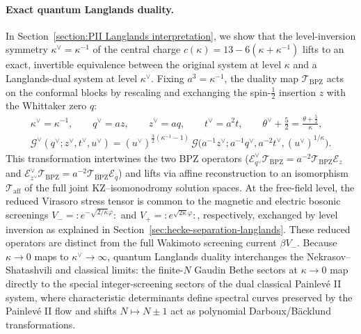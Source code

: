 \documentclass[a4paper,11pt]{article}
\numberwithin{equation}{section}
\begin{document}
\paragraph{Exact quantum Langlands duality.}
In Section~\ref{section:PII Langlands interpretation}, we show that the level-inversion symmetry $\kappa^{\vee}=\kappa^{-1}$ of the central charge $c(\kappa)=13-6(\kappa+\kappa^{-1})$ lifts to an exact, invertible equivalence between the original system at level $\kappa$ and a Langlands-dual system at level $\kappa^{\vee}$.  Fixing $a^{3}=\kappa^{-1}$, the duality map $\mathcal{T}_{\mathrm{BPZ}}$ acts on the conformal blocks by rescaling and exchanging the spin-$\frac{1}{2}$ insertion $z$ with the Whittaker zero $q$:
\begin{equation}
	\begin{gathered}
		\kappa^{\vee}=\kappa^{-1},\qquad
		q^{\vee}=az,\qquad
		z^{\vee}=aq,\qquad
		t^{\vee}=a^{2}t,\qquad
		\theta^{\vee}+\frac{5}{2}=\frac{\theta+\frac{5}{2}}{\kappa},\\[1mm]
		\mathcal{G}^{\vee}(q^{\vee};z^{\vee},t^{\vee},u^{\vee})
		=(u^{\vee})^{\frac{3}{2}(\kappa^{-1}-1)}\,
		\mathcal{G}\bigl(a^{-1}z^{\vee};a^{-1}q^{\vee},a^{-2}t^{\vee},(u^{\vee})^{1/\kappa}\bigr).
	\end{gathered}
\end{equation}
This transformation intertwines the two BPZ operators ($\mathcal{E}_{q^{\vee}}^{\vee}\mathcal{T}_{\mathrm{BPZ}}=a^{-2}\mathcal{T}_{\mathrm{BPZ}}\mathcal{E}_{z}$ and $\mathcal{E}_{z^{\vee}}^{\vee}\mathcal{T}_{\mathrm{BPZ}}=a^{-2}\mathcal{T}_{\mathrm{BPZ}}\mathcal{E}_{q}$) and lifts via affine reconstruction to an isomorphism $\mathcal{T}_{\mathrm{aff}}$ of the full joint KZ--isomonodromy solution spaces.  At the free-field level, the reduced Virasoro stress tensor is common to the magnetic and electric bosonic screenings $V_{-}=:e^{-\sqrt{2/\kappa}\varphi}:$ and $V_{+}=:e^{\sqrt{2\kappa}\varphi}:$, respectively, exchanged by level inversion as explained in Section~\ref{sec:hecke-separation-langlands}.  These reduced operators are distinct from the full Wakimoto screening current $\beta V_{-}$.  Because $\kappa\to0$ maps to $\kappa^{\vee}\to\infty$, quantum Langlands duality interchanges the Nekrasov--Shatashvili and classical limits: the finite-$N$ Gaudin Bethe sectors at $\kappa\to0$ map directly to the special integer-screening sectors of the dual classical Painlev\'e II system, where characteristic determinants define spectral curves preserved by the Painlev\'e II flow and shifts $N\mapsto N\pm1$ act as polynomial Darboux/B\"acklund transformations.
\end{document}
